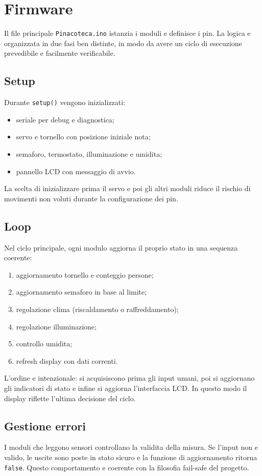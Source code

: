 \chapter{Firmware}

Il file principale \texttt{Pinacoteca.ino} istanzia i moduli e definisce i pin. La logica e organizzata in due fasi ben distinte, in modo da avere un ciclo di esecuzione prevedibile e facilmente verificabile.

\section{Setup}
Durante \texttt{setup()} vengono inizializzati:
\begin{itemize}
  \item seriale per debug e diagnostica;
  \item servo e tornello con posizione iniziale nota;
  \item semaforo, termostato, illuminazione e umidita;
  \item pannello LCD con messaggio di avvio.
\end{itemize}
La scelta di inizializzare prima il servo e poi gli altri moduli riduce il rischio di movimenti non voluti durante la configurazione dei pin.

\section{Loop}
Nel ciclo principale, ogni modulo aggiorna il proprio stato in una sequenza coerente:
\begin{enumerate}
  \item aggiornamento tornello e conteggio persone;
  \item aggiornamento semaforo in base al limite;
  \item regolazione clima (riscaldamento o raffreddamento);
  \item regolazione illuminazione;
  \item controllo umidita;
  \item refresh display con dati correnti.
\end{enumerate}
L'ordine e intenzionale: si acquisiscono prima gli input umani, poi si aggiornano gli indicatori di stato e infine si aggiorna l'interfaccia LCD. In questo modo il display riflette l'ultima decisione del ciclo.

\section{Gestione errori}
I moduli che leggono sensori controllano la validita della misura. Se l'input non e valido, le uscite sono poste in stato sicuro e la funzione di aggiornamento ritorna \texttt{false}. Questo comportamento e coerente con la filosofia fail-safe del progetto.


